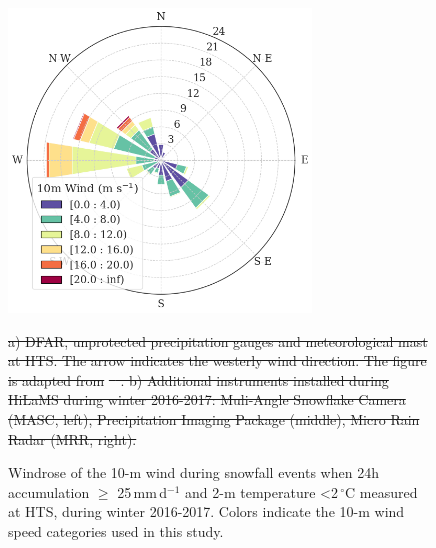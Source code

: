 \documentclass{ametsocV5}
\providecommand{\DIFdel}[1]{{\protect\color{red}\sout{#1}}}                      %
\providecommand{\DIFdelFL}[1]{\DIFdel{#1}} %
\providecommand{\DIFdelbeginFL}{} %
\providecommand{\DIFdelendFL}{} %
\newcommand{\DIFscaledelfig}{0.5}
\newlength{\DIFdelgraphicswidth} %
\newlength{\DIFdelgraphicsheight} %
\newcommand{\DIFdelincludegraphics}[2][]{%
\sbox{\DIFdelgraphicsbox}{\DIFOincludegraphics[#1]{#2}}%
\settoboxwidth{\DIFdelgraphicswidth}{\DIFdelgraphicsbox} %
\settoboxtotalheight{\DIFdelgraphicsheight}{\DIFdelgraphicsbox} %
\scalebox{\DIFscaledelfig}{%
\parbox[b]{\DIFdelgraphicswidth}{\usebox{\DIFdelgraphicsbox}\\[-\baselineskip] \rule{\DIFdelgraphicswidth}{0em}}\llap{\resizebox{\DIFdelgraphicswidth}{\DIFdelgraphicsheight}{%
\setlength{\unitlength}{\DIFdelgraphicswidth}%
\begin{picture}(1,1)%
\thicklines\linethickness{2pt} %
{\color[rgb]{1,0,0}\put(0,0){\framebox(1,1){}}}%
{\color[rgb]{1,0,0}\put(0,0){\line( 1,1){1}}}%
{\color[rgb]{1,0,0}\put(0,1){\line(1,-1){1}}}%
\end{picture}%
}\hspace*{3pt}}} %
} %
\DeclareRobustCommand{\DIFdelbeginFL}{\DIFOdelbeginFL \let\includegraphics\DIFdelincludegraphics} %
\DeclareRobustCommand{\DIFdelendFL}{\DIFOaddendFL \let\includegraphics\DIFOincludegraphics} %
\begin{document}
\begin{figure}[t]
	\noindent\includegraphics[width=19pc,angle=0]{fig2.png}\\
	\caption{Windrose of the 10-m wind during snowfall events when 24h accumulation $\geq$ 25\,mm\,d$^{-1}$ and 2-m temperature \textless 2\,$^{\circ}$C measured at HTS, during winter 2016-2017. Colors indicate the 10-m wind speed categories used in this study. 
	}
	\label{fig:windrose}
\DIFdelbeginFL %

{%
\DIFdelFL{a) DFAR, unprotected precipitation gauges and meteorological mast at HTS. The arrow indicates the westerly wind direction. The figure is adapted from }%
\DIFdelFL{\mbox{%
\citet{wolff_derivation_2015}}\hspace{0pt}%
. b) Additional instruments installed during HiLaMS during winter 2016-2017: Muli-Angle Snowflake Camera (MASC, left), Precipitation Imaging Package (middle), Micro Rain Radar (MRR, right).}}
\DIFdelendFL \end{figure}
\end{document}
